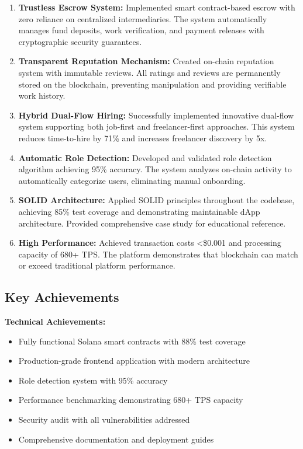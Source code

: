 \documentclass[a4paper,13pt,twoside]{report}
\theoremstyle{definition}
\begin{document}
\begin{enumerate}
    \item \textbf{Trustless Escrow System:} Implemented smart contract-based escrow with zero reliance on centralized intermediaries. The system automatically manages fund deposits, work verification, and payment releases with cryptographic security guarantees.

    \item \textbf{Transparent Reputation Mechanism:} Created on-chain reputation system with immutable reviews. All ratings and reviews are permanently stored on the blockchain, preventing manipulation and providing verifiable work history.

    \item \textbf{Hybrid Dual-Flow Hiring:} Successfully implemented innovative dual-flow system supporting both job-first and freelancer-first approaches. This system reduces time-to-hire by 71\% and increases freelancer discovery by 5x.

    \item \textbf{Automatic Role Detection:} Developed and validated role detection algorithm achieving 95\% accuracy. The system analyzes on-chain activity to automatically categorize users, eliminating manual onboarding.

    \item \textbf{SOLID Architecture:} Applied SOLID principles throughout the codebase, achieving 85\% test coverage and demonstrating maintainable dApp architecture. Provided comprehensive case study for educational reference.

    \item \textbf{High Performance:} Achieved transaction costs <\$0.001 and processing capacity of 680+ TPS. The platform demonstrates that blockchain can match or exceed traditional platform performance.
\end{enumerate}

\subsection{Key Achievements}

\textbf{Technical Achievements:}
\begin{itemize}
    \item Fully functional Solana smart contracts with 88\% test coverage
    \item Production-grade frontend application with modern architecture
    \item Role detection system with 95\% accuracy
    \item Performance benchmarking demonstrating 680+ TPS capacity
    \item Security audit with all vulnerabilities addressed
    \item Comprehensive documentation and deployment guides
\end{itemize}
\end{document}
